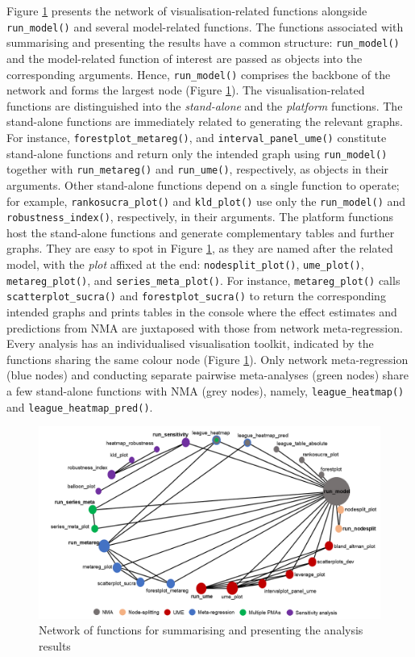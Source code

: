 Figure \ref{fig:network-visualisation} presents the network of visualisation-related
functions alongside \texttt{run\_model()} and several model-related functions. The
functions associated with summarising and presenting the results have a common
structure: \texttt{run\_model()} and the model-related function of interest are passed as
objects into the corresponding arguments. Hence, \texttt{run\_model()} comprises the backbone
of the network and forms the largest node (Figure \ref{fig:network-visualisation}).
The visualisation-related functions are distinguished into the \emph{stand-alone} and
the \emph{platform} functions. The stand-alone functions are immediately related to
generating the relevant graphs. For instance, \texttt{forestplot\_metareg()}, and \texttt{interval\_panel\_ume()}
constitute stand-alone functions and return only the intended graph using \texttt{run\_model()}
together with \texttt{run\_metareg()} and \texttt{run\_ume()}, respectively, as objects in their
arguments. Other stand-alone functions depend on a single function to operate;
for example, \texttt{rankosucra\_plot()} and \texttt{kld\_plot()} use only the \texttt{run\_model()} and
\texttt{robustness\_index()}, respectively, in their arguments. The platform functions
host the stand-alone functions and generate complementary tables and further graphs.
They are easy to spot in Figure \ref{fig:network-visualisation}, as they are named
after the related model, with the \emph{plot} affixed at the end: \texttt{nodesplit\_plot()},
\texttt{ume\_plot()}, \texttt{metareg\_plot()}, and \texttt{series\_meta\_plot()}. For instance,
\texttt{metareg\_plot()} calls \texttt{scatterplot\_sucra()} and \texttt{forestplot\_sucra()} to return
the corresponding intended graphs and prints tables in the console where the
effect estimates and predictions from NMA are juxtaposed with those from network
meta-regression. Every analysis has an individualised visualisation toolkit,
indicated by the functions sharing the same colour node (Figure \ref{fig:network-visualisation}).
Only network meta-regression (blue nodes) and conducting separate pairwise
meta-analyses (green nodes) share a few stand-alone functions with NMA (grey nodes),
namely, \texttt{league\_heatmap()} and \texttt{league\_heatmap\_pred()}.

\begin{figure}
\includegraphics[width=1\linewidth,height=0.3\textheight]{network_visualisation} \caption{Network of functions for summarising and presenting the analysis results}\label{fig:network-visualisation}
\end{figure}

